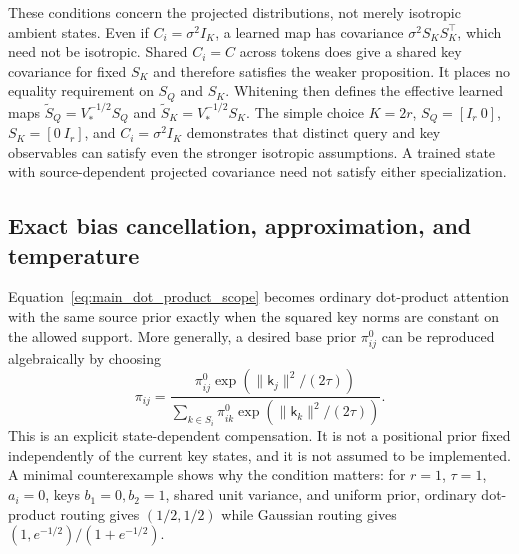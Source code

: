 \documentclass[twoside,11pt]{article}
\begin{document}
These conditions concern the projected distributions, not merely isotropic ambient states. Even if $C_i=\sigma^2I_K$, a learned map has covariance $\sigma^2S_KS_K^\top$, which need not be isotropic. Shared $C_i=C$ across tokens does give a shared key covariance for fixed $S_K$ and therefore satisfies the weaker proposition. It places no equality requirement on $S_Q$ and $S_K$. Whitening then defines the effective learned maps $\widetilde S_Q=V_*^{-1/2}S_Q$ and $\widetilde S_K=V_*^{-1/2}S_K$. The simple choice $K=2r$, $S_Q=[I_r\ 0]$, $S_K=[0\ I_r]$, and $C_i=\sigma^2I_K$ demonstrates that distinct query and key observables can satisfy even the stronger isotropic assumptions. A trained state with source-dependent projected covariance need not satisfy either specialization.

\subsection{Exact bias cancellation, approximation, and temperature}
\label{sec:bias_cancellation}

Equation~\eqref{eq:main_dot_product_scope} becomes ordinary dot-product attention with the same source prior exactly when the squared key norms are constant on the allowed support. More generally, a desired base prior $\pi^0_{ij}$ can be reproduced algebraically by choosing
\begin{equation}
\pi_{ij}=
\frac{\pi^0_{ij}\exp(\|\mathsf k_j\|^2/(2\tau))}
{\sum_{k\in S_i}\pi^0_{ik}\exp(\|\mathsf k_k\|^2/(2\tau))}.
\label{eq:projected_key_bias_compensation}
\end{equation}
This is an explicit state-dependent compensation. It is not a positional prior fixed independently of the current key states, and it is not assumed to be implemented. A minimal counterexample shows why the condition matters: for $r=1$, $\tau=1$, $a_i=0$, keys $b_1=0,b_2=1$, shared unit variance, and uniform prior, ordinary dot-product routing gives $(1/2,1/2)$ while Gaussian routing gives $(1,e^{-1/2})/(1+e^{-1/2})$.
\end{document}
